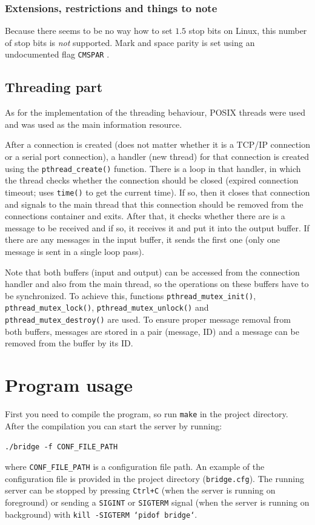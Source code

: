 \subsubsection{Extensions, restrictions and things to note}

Because there seems to be no way how to set $1.5$ stop bits on Linux, this
number of stop bits is \emph{not} supported. Mark and space parity is set using
an undocumented flag \texttt{CMSPAR} \cite{MarkSpaceParity}.

\subsection{Threading part}

As for the implementation of the threading behaviour, POSIX threads were used
and \cite{POSIXThreadsProgramming} was used as the main information resource.

After a connection is created (does not matter whether it is a TCP/IP
connection or a serial port connection), a handler (new thread) for that connection is
created using the \texttt{pthread\_create()} function. There is a loop in that
handler, in which the thread checks whether the connection should be closed
(expired connection timeout; uses \texttt{time()} to get the current time).
If so, then it closes that connection and signals to the main thread that this
connection should be removed from the connections container and exits.
After that, it checks whether there are is a message to be received and if so,
it receives it and put it into the output buffer. If there are any messages
in the input buffer, it sends the first one (only one message is sent in
a single loop pass).

Note that both buffers (input and output) can be accessed from the connection
handler and also from the main thread, so the operations on these buffers
have to be synchronized. To achieve this, functions \texttt{pthread\_mutex\_init()},
\texttt{pthread\_mutex\_lock()}, \texttt{pthread\_mutex\_unlock()} and
\texttt{pthread\_mutex\_destroy()} are used.
To ensure proper message removal from both buffers, messages are stored in
a pair (message, ID) and a message can be removed from the buffer by its ID.

\section{Program usage}

First you need to compile the program, so run \texttt{make} in the project
directory. After the compilation you can start the server by running:
\begin{center}
	\texttt{./bridge -f CONF\_FILE\_PATH}
\end{center}
where \texttt{CONF\_FILE\_PATH} is a configuration file path.
An example of the configuration file is provided in the project directory
(\texttt{bridge.cfg}).
The running server can be stopped by pressing \texttt{Ctrl+C} (when the server
is running on foreground) or sending a \texttt{SIGINT} or \texttt{SIGTERM} signal
(when the server is running on background) with \texttt{kill -SIGTERM `pidof bridge`}.


